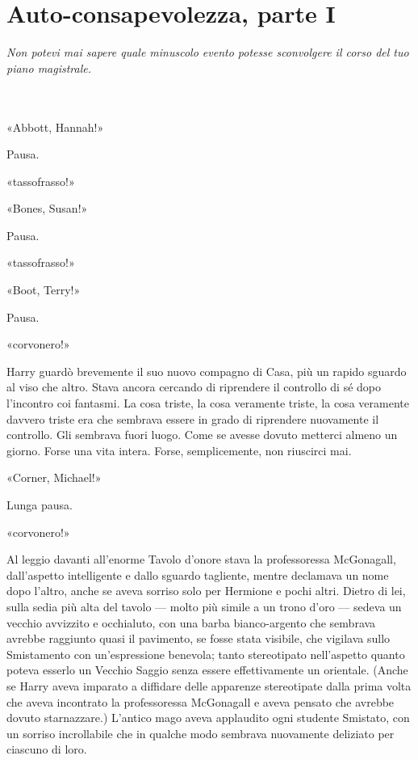
\chapter{Auto-consapevolezza, parte I}
\label{capitolo:9}

\emph{Non potevi mai sapere quale minuscolo evento potesse sconvolgere il corso del tuo piano magistrale.}

~\\
~\\


«Abbott, Hannah!»

Pausa.

«tassofrasso!»

«Bones, Susan!»

Pausa.

«tassofrasso!»

«Boot, Terry!»

Pausa.

«corvonero!»

Harry guardò brevemente il suo nuovo compagno di Casa, più un rapido sguardo al viso che altro. Stava ancora cercando di riprendere il controllo di sé dopo l’incontro coi fantasmi. La cosa triste, la cosa veramente triste, la cosa veramente davvero triste era che sembrava essere in grado di riprendere nuovamente il controllo. Gli sembrava fuori luogo. Come se avesse dovuto metterci almeno un giorno. Forse una vita intera. Forse, semplicemente, non riuscirci mai.

«Corner, Michael!»

Lunga pausa.

«corvonero!»

Al leggio davanti all’enorme Tavolo d’onore stava la professoressa McGonagall, dall’aspetto intelligente e dallo sguardo tagliente, mentre declamava un nome dopo l’altro, anche se aveva sorriso solo per Hermione e pochi altri. Dietro di lei, sulla sedia più alta del tavolo — molto più simile a un trono d’oro — sedeva un vecchio avvizzito e occhialuto, con una barba bianco-argento che sembrava avrebbe raggiunto quasi il pavimento, se fosse stata visibile, che vigilava sullo Smistamento con un’espressione benevola; tanto stereotipato nell’aspetto quanto poteva esserlo un Vecchio Saggio senza essere effettivamente un orientale. (Anche se Harry aveva imparato a diffidare delle apparenze stereotipate dalla prima volta che aveva incontrato la professoressa McGonagall e aveva pensato che avrebbe dovuto starnazzare.) L’antico mago aveva applaudito ogni studente Smistato, con un sorriso incrollabile che in qualche modo sembrava nuovamente deliziato per ciascuno di loro.

